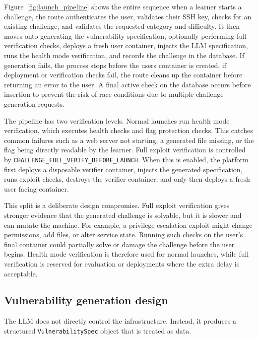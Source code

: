 Figure~\ref{fig:launch_pipeline} shows the entire sequence when a learner starts a challenge, the route authenticates the user, validates their SSH key, checks for an existing challenge, and validates the requested category and difficulty. It then moves onto generating the vulnerability specification, optionally performing full verification checks, deploys a fresh user container, injects the LLM specification, runs the health mode verification, and records the challenge in the database. If generation fails, the process stops before the users container is created, if deployment or verification checks fail, the route cleans up the container before returning an error to the user. A final active check on the database occurs before insertion to prevent the risk of race conditions due to multiple challenge generation requests.

The pipeline has two verification levels. Normal launches run health mode verification, which executes health checks and flag protection checks. This catches common failures such as a web server not starting, a generated file missing, or the flag being directly readable by the learner. Full exploit verification is controlled by \lstinline|CHALLENGE_FULL_VERIFY_BEFORE_LAUNCH|. When this is enabled, the platform first deploys a disposable verifier container, injects the generated specification, runs exploit checks, destroys the verifier container, and only then deploys a fresh user facing container.

This split is a deliberate design compromise. Full exploit verification gives stronger evidence that the generated challenge is solvable, but it is slower and can mutate the machine. For example, a privilege escalation exploit might change permissions, add files, or alter service state. Running such checks on the user's final container could partially solve or damage the challenge before the user begins. Health mode verification is therefore used for normal launches, while full verification is reserved for evaluation or deployments where the extra delay is acceptable.

\subsection{Vulnerability generation design}\label{sec:vuln_gen_design}

The LLM does not directly control the infrastructure. Instead, it produces a structured \lstinline|VulnerabilitySpec| object that is treated as data.

